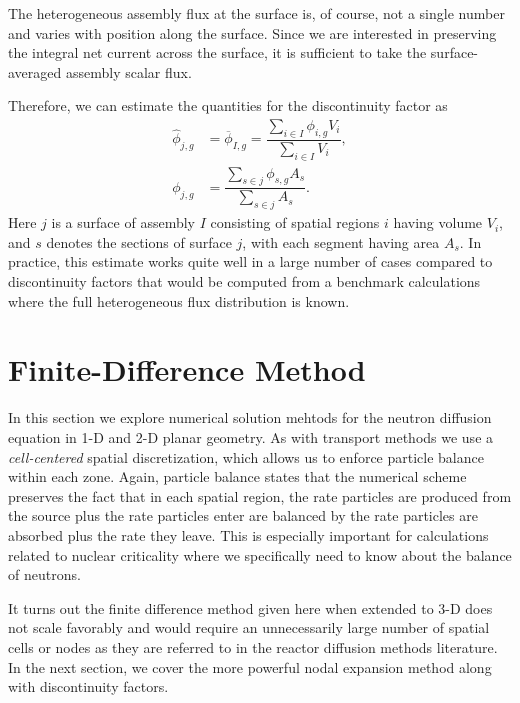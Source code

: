 The heterogeneous assembly flux at the surface is, of course, not a single number and varies with position along the surface. Since we are interested in preserving the integral net current across the surface, it is sufficient to take the surface-averaged assembly scalar flux.

Therefore, we can estimate the quantities for the discontinuity factor as
\begin{subequations}
\begin{align}
  \widehat{\phi}_{j,g} &= \overline{\phi}_{I,g} = \dfrac{ \displaystyle\sum_{i \in I } \phi_{i,g} V_i }{ \displaystyle\sum_{i \in I } V_i }, \\
  \phi_{j,g} &= \dfrac{ \displaystyle\sum_{s \in j} \phi_{s,g} A_s }{ \displaystyle\sum_{s \in j } A_s } .
\end{align}
\end{subequations}
Here $j$ is a surface of assembly $I$ consisting of spatial regions $i$ having volume $V_i$, and $s$ denotes the sections of surface $j$, with each segment having area $A_s$. In practice, this estimate works quite well in a large number of cases compared to discontinuity factors that would be computed from a benchmark calculations where the full heterogeneous flux distribution is known.





\section{Finite-Difference Method}

In this section we explore numerical solution mehtods for the neutron diffusion equation in 1-D and 2-D planar geometry. As with transport methods we use a \emph{cell-centered} spatial discretization, which allows us to enforce particle balance within each zone. Again, particle balance states that the numerical scheme preserves the fact that in each spatial region, the rate particles are produced from the source plus the rate particles enter are balanced by the rate particles are absorbed plus the rate they leave. This is especially important for calculations related to nuclear criticality where we specifically need to know about the balance of neutrons. 

It turns out the finite difference method given here when extended to 3-D does not scale favorably and would require an unnecessarily large number of spatial cells or nodes as they are referred to in the reactor diffusion methods literature. In the next section, we cover the more powerful nodal expansion method along with discontinuity factors.


